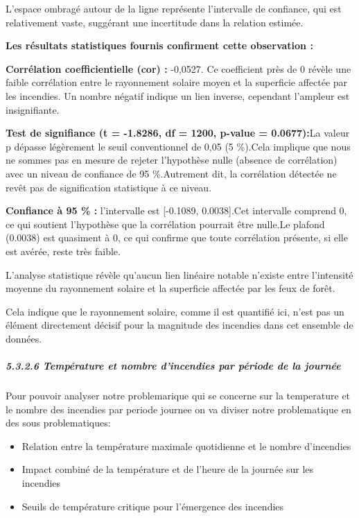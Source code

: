 \documentclass[
]{article}
\providecommand{\tightlist}{%
  \setlength{\itemsep}{0pt}\setlength{\parskip}{0pt}}
\begin{document}
L'espace ombragé autour de la ligne représente l'intervalle de
confiance, qui est relativement vaste, suggérant une incertitude dans la
relation estimée.

\textbf{Les résultats statistiques fournis confirment cette observation
:}

\textbf{Corrélation coefficientielle (cor) :} -0,0527. Ce coefficient
près de 0 révèle une faible corrélation entre le rayonnement solaire
moyen et la superficie affectée par les incendies. Un nombre négatif
indique un lien inverse, cependant l'ampleur est insignifiante.

\textbf{Test de signifiance (t = -1.8286, df = 1200, p-value =
0.0677):}La valeur p dépasse légèrement le seuil conventionnel de 0,05
(5 \%).Cela implique que nous ne sommes pas en mesure de rejeter
l'hypothèse nulle (absence de corrélation) avec un niveau de confiance
de 95 \%.Autrement dit, la corrélation détectée ne revêt pas de
signification statistique à ce niveau.

\textbf{Confiance à 95 \% :} l'intervalle est {[}-0.1089, 0.0038{]}.Cet
intervalle comprend 0, ce qui soutient l'hypothèse que la corrélation
pourrait être nulle.Le plafond (0.0038) est quasiment à 0, ce qui
confirme que toute corrélation présente, si elle est avérée, reste très
faible.

L'analyse statistique révèle qu'aucun lien linéaire notable n'existe
entre l'intensité moyenne du rayonnement solaire et la superficie
affectée par les feux de forêt.

Cela indique que le rayonnement solaire, comme il est quantifié ici,
n'est pas un élément directement décisif pour la magnitude des incendies
dans cet ensemble de données.

\subparagraph{5.3.2.6 Température et nombre d'incendies par période de
la
journée}\label{tempuxe9rature-et-nombre-dincendies-par-puxe9riode-de-la-journuxe9e}

Pour pouvoir analyser notre problemarique qui se concerne sur la
temperature et le nombre des incendies par periode journee on va diviser
notre problematique en des sous problematiques:

\begin{itemize}
\tightlist
\item
  Relation entre la température maximale quotidienne et le nombre
  d'incendies
\item
  Impact combiné de la température et de l'heure de la journée sur les
  incendies
\item
  Seuils de température critique pour l'émergence des incendies
\end{itemize}
\end{document}
